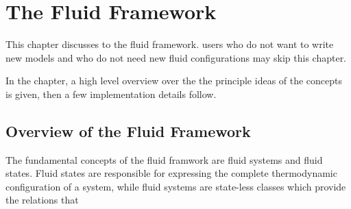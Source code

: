 \chapter{The \Dumux Fluid Framework}
\label{sec:fluidframework}

This chapter discusses to the \Dumux fluid framework. \Dumux users who
do not want to write new models and who do not need new fluid
configurations may skip this chapter.

In the chapter, a high level overview over the the principle ideas of
the concepts is given, then a few implementation details follow.

\section{Overview of the Fluid Framework}

The fundamental concepts of the \Dumux fluid framwork are fluid
systems and fluid states. Fluid states are responsible for expressing
the complete thermodynamic configuration of a system, while fluid
systems are state-less classes which provide the relations that 

